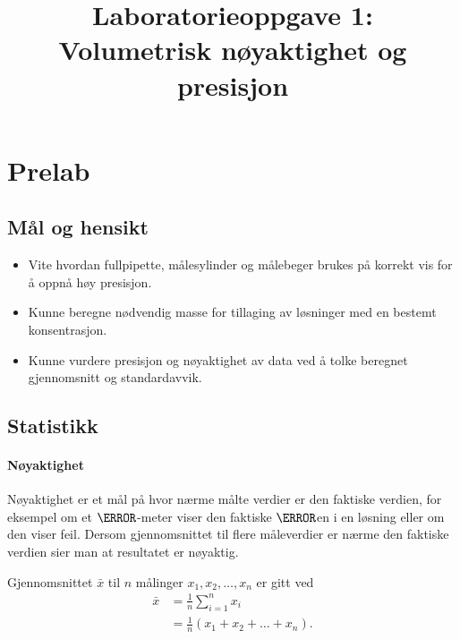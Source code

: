 


\title{Laboratorieoppgave 1:\\
Volumetrisk nøyaktighet og presisjon}
\author{}
\date{}


			
	\maketitle
	
	\section{Prelab}
	
	\subsection{Mål og hensikt}
	\begin{itemize}
		\item Vite hvordan fullpipette, målesylinder og målebeger brukes på korrekt vis for å oppnå høy presisjon.
		
		\item Kunne beregne nødvendig masse for tillaging av løsninger med en bestemt konsentrasjon.
		
		\item Kunne vurdere presisjon og nøyaktighet av data ved å tolke beregnet gjennomsnitt og standardavvik.
	\end{itemize}
	
	\subsection{Statistikk}
	
	\paragraph{Nøyaktighet}
	Nøyaktighet er et mål på hvor nærme målte verdier er den faktiske verdien, for eksempel om et $\pH$-meter viser den faktiske $\pH$en i en løsning eller om den viser feil. Dersom gjennomsnittet til flere måleverdier er nærme den faktiske verdien sier man at resultatet er nøyaktig.
	
	Gjennomsnittet $\bar{x}$ til $n$ målinger $x_1, x_2, \ldots, x_n$ er gitt ved
	\begin{align*}
		\bar{x} &= \frac{1}{n}\sum_{i=1}^{n}x_i\\
		&=\frac{1}{n}\left(x_1 + x_2 + \dots + x_n\right).
	\end{align*}
	
